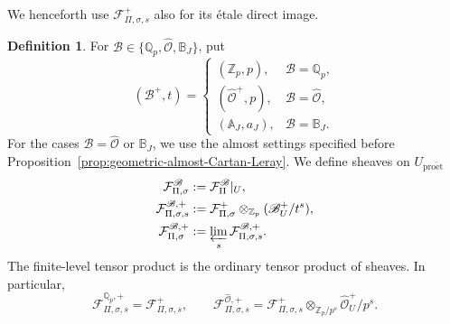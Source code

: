 \documentclass[11pt]{article}
\theoremstyle{definition}
\newtheorem{definition}[theorem]{Definition}
\newcommand{\Qp}{\mathbb Q_p}
\newcommand{\Zp}{\mathbb Z_p}
\newcommand{\cF}{\mathcal F}
\newcommand{\proet}{\mathrm{pro\acute et}}
\begin{document}
We henceforth use \(\cF_{\Pi,\sigma,s}^+\) also for its
\'etale direct image.

\begin{definition}
\label{def:local-three-coefficients}
\label{def:local-structural-coefficients}
\label{def:local-period-coefficients}
For \(\mathscr B\in\{\Qp,\widehat{\mathscr O},\mathbb B_J\}\), put
\[
 (\mathscr B^+,t)=
 \begin{cases}
 (\Zp,p),&\mathscr B=\Qp,\\
 (\widehat{\mathscr O}^{+},p),&\mathscr B=\widehat{\mathscr O},\\
 (\mathbb A_J,a_J),&\mathscr B=\mathbb B_J.
 \end{cases}
\]
For the cases $\mathscr{B}=\widehat{\mathscr{O}}$ or $\mathbb{B}_J$, we use the almost settings specified before
Proposition~\ref{prop:geometric-almost-Cartan-Leray}. We define sheaves on \(U_{\proet}\)
\begin{align*}
 \cF_{\Pi,\sigma}^{\mathscr B}&:=\cF_\Pi^{\mathscr B}|_U,\\
 \cF_{\Pi,\sigma,s}^{\mathscr B,+}
 &:=\cF_{\Pi,\sigma}^+\otimes_{\Zp}
       (\mathscr B_U^+/t^{s}),\\
 \cF_{\Pi,\sigma}^{\mathscr B,+}
 &:=\varprojlim_s\cF_{\Pi,\sigma,s}^{\mathscr B,+}.
\end{align*}
The finite-level tensor product is the ordinary tensor
product of sheaves.  In particular,
\[
 \cF_{\Pi,\sigma,s}^{\Qp,+}=\cF_{\Pi,\sigma,s}^+,
 \qquad
 \cF_{\Pi,\sigma,s}^{\widehat{\mathscr O},+}
 =\cF_{\Pi,\sigma,s}^+\otimes_{\Zp/p^s}
       \widehat{\mathscr O}_U^+/p^s.
\]
\end{definition}
\end{document}
